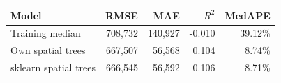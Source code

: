 \begin{tabular}{@{}lrrrr@{}}
\toprule
Model & RMSE & MAE & $R^2$ & MedAPE \\
\midrule
Training median & 708,732 & 140,927 & -0.010 & 39.12\% \\
Own spatial trees & 667,507 & 56,568 & 0.104 & 8.74\% \\
sklearn spatial trees & 666,545 & 56,592 & 0.106 & 8.71\% \\
\bottomrule
\end{tabular}
